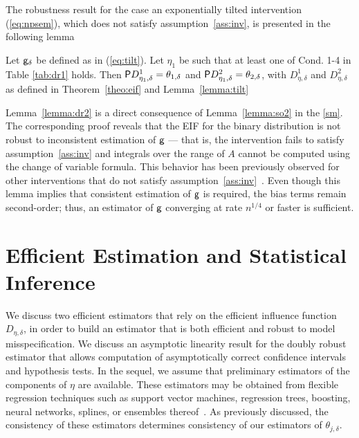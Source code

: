 The robustness result for the case an exponentially tilted intervention
(\ref{eq:npsem}), which does not satisfy assumption~\ref{ass:inv}, is presented
in the following lemma
\begin{lemma}
  \label{lemma:dr2}\label{finallemma}
  Let $\g_\delta$ be defined as in (\ref{eq:tilt}). Let $\eta_1$ be such that at
  least one of Cond. 1-4 in Table \ref{tab:dr1} holds. Then $\P
  D_{\eta_1,\delta}^1=\theta_{1,\delta}$ and $\P
  D_{\eta_1,\delta}^2=\theta_{2,\delta}$, with $D_{\eta,\delta}^1$ and
  $D_{\eta,\delta}^2$ as defined in Theorem~\ref{theo:eif} and
  Lemma~\ref{lemma:tilt}
\end{lemma}

Lemma~\ref{lemma:dr2} is a direct consequence of Lemma~\ref{lemma:so2} in
the \ref{sm}. The corresponding proof reveals that the EIF for the binary
distribution is not robust to inconsistent estimation of $\g$ --- that is, the
intervention fails to satisfy assumption~\ref{ass:inv} and integrals over the
range of $A$ cannot be computed using the change of variable formula. This
behavior has been previously observed for other interventions that do not
satisfy assumption~\ref{ass:inv}~\citep[e.g.,][]{diaz2013assessing}. Even though
this lemma implies that consistent estimation of $\g$ is required, the bias
terms remain second-order; thus, an estimator of $\g$ converging at rate
$n^{1/4}$ or faster is sufficient.

\section{Efficient Estimation and Statistical Inference}\label{sec:estima}
We discuss two efficient estimators that rely on the efficient influence
function $D_{\eta, \delta}$, in order to build an estimator that is both
efficient and robust to model misspecification. We discuss an asymptotic
linearity result for the doubly robust estimator that allows computation of
asymptotically correct confidence intervals and hypothesis tests. In the sequel,
we assume that preliminary estimators of the components of $\eta$ are available.
These estimators may be obtained from flexible regression techniques such as
support vector machines, regression trees, boosting, neural networks, splines,
or ensembles thereof~\citep{wolpert1992stacked, breiman1996stacked,
vdl2007super}. As previously discussed, the consistency of these estimators
determines consistency of our estimators of $\theta_{j, \delta}$.

